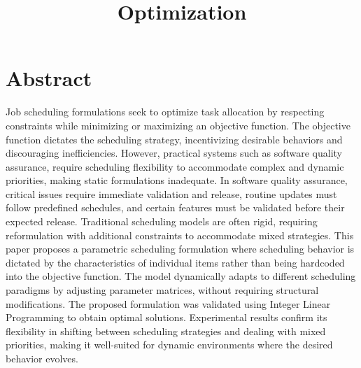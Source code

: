 \documentclass[12pt]{article}
\title{Optimization}
\author{}
\date{}
\begin{document}
\maketitle

\section*{Abstract}


Job scheduling formulations seek to optimize task allocation by respecting constraints while minimizing or maximizing an objective function. The objective function dictates the scheduling strategy, incentivizing desirable behaviors and discouraging inefficiencies. However, practical systems such as software quality assurance, require scheduling flexibility to accommodate complex and dynamic priorities, making static formulations inadequate. In software quality assurance, critical issues require immediate validation and release, routine updates must follow predefined schedules, and certain features must be validated before their expected release. Traditional scheduling models are often rigid, requiring reformulation with additional constraints to accommodate mixed strategies. This paper proposes a parametric scheduling formulation where scheduling behavior is dictated by the characteristics of individual items rather than being hardcoded into the objective function. The model dynamically adapts to different scheduling paradigms by adjusting parameter matrices, without requiring structural modifications. The proposed formulation was validated using Integer Linear Programming to obtain optimal solutions. Experimental results confirm its flexibility in shifting between scheduling strategies and dealing with mixed priorities, making it well-suited for dynamic environments where the desired behavior evolves.
\end{document}
